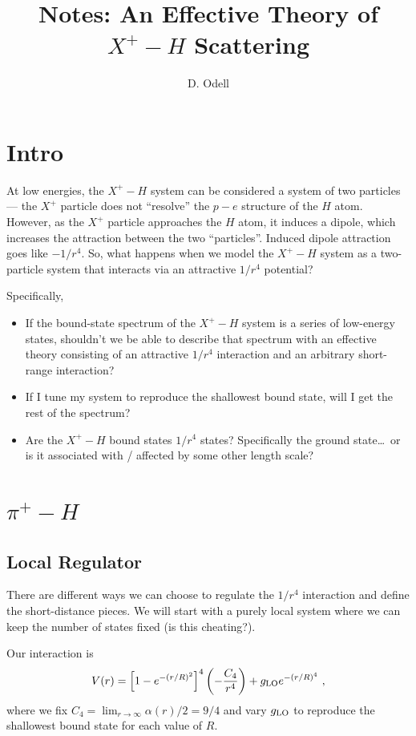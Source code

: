 \documentclass{article}
\title{Notes: An Effective Theory of $X^+-H$ Scattering}
\author{D. Odell}
\begin{document}
\maketitle

\section{Intro}

At low energies, the $X^+-H$ system can be considered a system of two particles
--- the $X^+$ particle does not ``resolve'' the $p-e$ structure of the $H$ atom.
However, as the $X^+$ particle approaches the $H$ atom, it induces a dipole,
which increases the attraction between the two ``particles''.
Induced dipole attraction goes like $-1/r^4$.
So, what happens when we model the $X^+-H$ system as a two-particle system that
interacts via an attractive $1/r^4$ potential?

Specifically,
\begin{itemize}
  \item If the bound-state spectrum of the $X^+-H$ system is a series of
low-energy states, shouldn't we be able to describe that spectrum with an
effective theory consisting of an attractive $1/r^4$ interaction and an
arbitrary short-range interaction?
  \item If I tune my system to reproduce the shallowest bound state, will I get the rest
of the spectrum?
  \item Are the $X^+-H$ bound states $1/r^4$ states? Specifically the ground
    state\ldots\ or is it associated with / affected by some other length scale?
\end{itemize}


\section{$\pi^+-H$}

\subsection{Local Regulator}

There are different ways we can choose to regulate the $1/r^4$ interaction and
define the short-distance pieces.
We will start with a purely local system where we can keep the number of states
fixed (is this cheating?).

Our interaction is
\begin{equation}
  \label{eq:local_interaction}
  V(r) = \left[1 - e^{-(r/R)^2}\right]^4 \left(-\frac{C_4}{r^4}\right) + g_{\rm
  LO} e^{-(r/R)^4}~,
\end{equation}
where we fix $C_4 = \lim_{r\rightarrow\infty} \alpha(r)/2 = 9/4$ and vary $g_{\rm LO}$ to reproduce the shallowest bound state for
each value of $R$.
\end{document}
